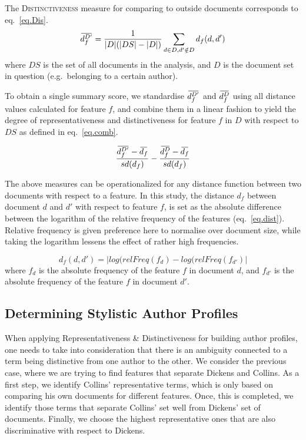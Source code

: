 \documentclass[a4paper,10pt,twoside,fleqn]{article}
\newcommand{\overbar}[1]{\mkern 2.0mu\overline{\mkern-2.0mu#1\mkern-2.0mu}\mkern 2.0mu}
\begin{document}
The \textsc{Distinctiveness} measure for comparing to outside documents corresponds
to eq.~\ref{eq.Dis}.\\

\begin{equation}\label{eq.Dis}
 \overbar{d_f^{D'}} = \frac{1}{|D|(|DS| -|D|)} \sum\limits_{d \in D, d'\notin D} d_f(d,d')
\end{equation}
where $DS$ is the set of all documents in the analysis, 
and $D$ is the document set in question (e.g.\ belonging to a certain author).


To obtain a single summary score, we standardise $\overbar{d_f^{D'}}$  and $\overbar{d_f^{D}}$ using all distance values calculated for feature $f$, 
and combine them in a linear fashion to yield the degree of representativeness and distinctiveness for feature $f$ in $D$ with respect to $DS$ as defined in eq.~\ref{eq.comb}.

\begin{equation}\label{eq.comb}
\frac{\overbar{d^{D'}_f} - \overbar{d_f} }{sd(d_f)} - \frac{\overbar{d^{D}_f} - \overbar{d_f}}{sd(d_f)}
\end{equation}


The above measures can be operationalized for any distance function between two documents with respect to a feature.
In this study, the distance $d_f$ between document $d$ and $d'$ with respect to feature $f$,
is set as the absolute difference between the logarithm of the relative frequency of the features (eq.~\ref{eq.dist}).
Relative frequency is given preference here to normalise over document size, 
while taking the logarithm lessens the effect of rather high frequencies.

\begin{equation} \label{eq.dist}
 d_f(d,d') = |log(relFreq(f_{d}) - log(relFreq(f_{d'})|
\end{equation}
where $f_{d}$ is the absolute frequency of the feature $f$ in document $d$,
and $f_{d'}$ is the absolute frequency of the feature $f$ in document $d'$.

\subsection{Determining Stylistic Author Profiles}

When applying Representativeness \& Distinctiveness for building author profiles,
one needs to take into consideration that there is an ambiguity connected to
a term being  distinctive from one author to the other.
We consider the previous case, where we are trying to find features that
separate Dickens and Collins.
As a first step, we identify Collins' representative terms, which is only based on
comparing his own documents for different features. Once, this is completed,
we identify those terms that separate Collins' set well from Dickens' set
of documents.
Finally, we choose the highest representative ones that are also
discriminative with respect to Dickens.
\end{document}
